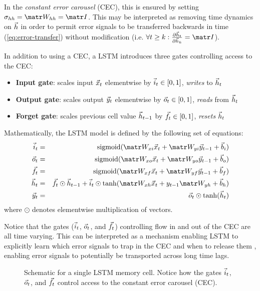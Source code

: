 \documentclass[dissertation.tex]{subfiles}
\begin{document}
In the \emph{constant error carousel} (CEC), this is ensured by setting
$\sigma_{hh} = \W_{hh} = \I$. This may be interpreted as removing time dynamics
on $\vec{h}$ in order to permit error signals to be transferred backwards in time
(\autoref{eq:error-transfer}) without modification (i.e. $\forall t \geq k: \frac{\pd
\h_t}{\pd \h_k} = \I$).

In addition to using a CEC, a LSTM introduces three gates controlling access to the CEC:
\begin{itemize}
    \item \textbf{Input gate}: scales input $\vec{x}_t$ elementwise by $\vec{i}_t \in [0,1]$, \emph{writes} to $\vec{h}_t$
    \item \textbf{Output gate}: scales output $\vec{y}_t$ elementwise by $\vec{o}_t \in [0,1]$, \emph{reads} from $\vec{h}_t$
    \item \textbf{Forget gate}: scales previous cell value $\vec{h}_{t-1}$ by $\vec{f}_t \in [0,1]$, \emph{resets} $\vec{h}_t$
\end{itemize}

Mathematically, the LSTM model is defined by the following set of equations:
\begin{eqnarray}
    \i_t &=& \sigmoid(\W_{xi} \x_t + \W_{yi} \y_{t-1} + \b_i) \\
    \o_t &=& \sigmoid(\W_{xo} \x_t + \W_{yo} \y_{t-1} + \b_o) \\
    \f_t &=& \sigmoid(\W_{xf} \x_t + \W_{yf} \y_{t-1} + \b_f) \\
    \h_t &=& \f_t \odot \h_{t-1} + \i_t \odot \tanh(\W_{xh}\x_t + y_{t-1} \W_{yh} + \b_h) \label{eq:lstm-dynamics} \\
    \y_t &=& \o_t \odot \tanh(\h_t)
\end{eqnarray}
where $\odot$ denotes elementwise multiplication of vectors.

Notice that the gates ($\vec{i}_t$, $\vec{o}_t$, and $\vec{f}_t$) controlling flow in and out
of the CEC are all time varying. This can be interpreted as a mechanism
enabling LSTM to explicitly learn which error signals to trap in the CEC and
when to release them \cite{hochreiter1997long}, enabling error signals to
potentially be transported across long time lags.

\begin{figure}[htpb]
    \centering
    
    \caption{Schematic for a single LSTM memory cell. Notice how the gates $\vec{i}_t$, $\vec{o}_t$, and $\vec{f}_t$ control
    access to the constant error carousel (CEC).}
    \label{fig:lstm-cell}
\end{figure}
\end{document}
